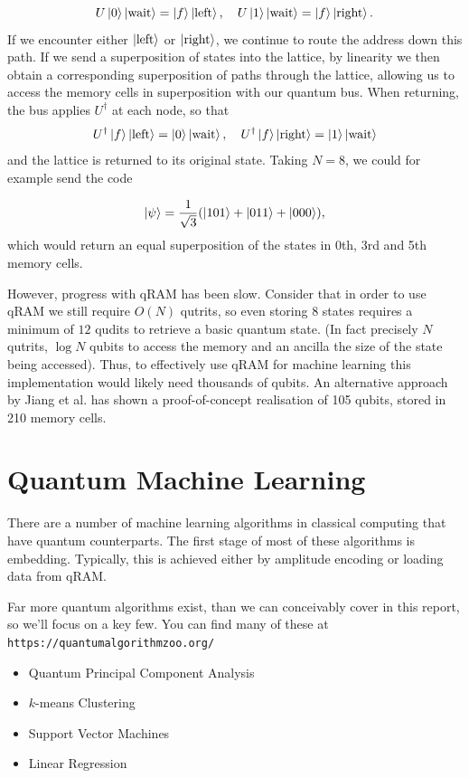\documentclass{article}
\theoremstyle{definition}
\begin{document}
\[
U \ket{0} \ket{\text{wait}} = \ket{f} \ket{\text{left}} , \quad U \ket{1} \ket{\text{wait}} = \ket{f} \ket{\text{right}}.
\]
If we encounter either $\ket{\text{left}} $ or $\ket{\text{right}}$, we continue to route the address down this path. If we send a superposition of states into the lattice, by linearity we then obtain a corresponding superposition of paths through the lattice, allowing us to access the memory cells in superposition with our quantum bus. When returning, the bus applies $U^\dagger $ at each node, so that
\[
  U^\dagger \ket{f} \ket{\text{left}} =  \ket{0} \ket{\text{wait}} , \quad U^\dagger \ket{f} \ket{\text{right}} = \ket{1} \ket{\text{wait}} 
\]
and the lattice is returned to its original state. Taking $N=8$, we could for example send the code

\[
\ket{\psi} = \frac{1}{\sqrt{3}} ( \ket{101} + \ket{011} + \ket{000}),
\]
which would return an equal superposition of the states in 0th, 3rd and 5th memory cells. 

However, progress with qRAM has been slow. Consider that in order to use qRAM we still require $O(N)$ qutrits, so even storing $8$ states requires a minimum of $12$ qudits to retrieve a basic quantum state. (In fact precisely $N$ qutrits, $\log N $ qubits to access the memory and an ancilla the size of the state being accessed). Thus, to effectively use qRAM for machine learning this implementation would likely need thousands of qubits. An alternative approach by Jiang et al. \cite{Jiang} has shown a proof-of-concept realisation of 105 qubits, stored in 210 memory cells. 


\section{Quantum Machine Learning}
There are a number of machine learning algorithms in classical computing that have quantum counterparts. The first stage of most of these algorithms is embedding. Typically, this is achieved either by amplitude encoding or loading data from qRAM. 

Far more quantum algorithms exist, than we can conceivably cover in this report, so we'll focus on a key few. You can find many of these at \verb|https://quantumalgorithmzoo.org/|

\begin{itemize}
    \item Quantum Principal Component Analysis \cite{Lloyd_2014}
    \item $k$-means Clustering \cite{lloyd2013quantum}
    \item Support Vector Machines \cite{Rebentrost_2014}
    \item Linear Regression \cite{Schuld_2016}
\end{itemize}
\end{document}
